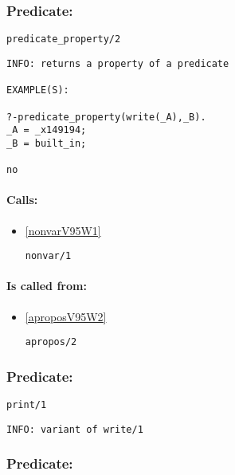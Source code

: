 \subsubsection{Predicate:} \label{predicateV95WpropertyV95W2}

\begin{verbatim}
predicate_property/2
\end{verbatim}

{\small \begin{verbatim}
INFO: returns a property of a predicate

EXAMPLE(S):

?-predicate_property(write(_A),_B).
_A = _x149194;
_B = built_in;

no

\end{verbatim}}
\paragraph{Calls:} 
\begin{itemize}
\item \ref{nonvarV95W1} 
\begin{verbatim}
nonvar/1
\end{verbatim}

\end{itemize}
\paragraph{Is called from:} 
\begin{itemize}
\item \ref{aproposV95W2} 
\begin{verbatim}
apropos/2
\end{verbatim}

\end{itemize}

\subsubsection{Predicate:} \label{printV95W1}

\begin{verbatim}
print/1
\end{verbatim}

{\small \begin{verbatim}
INFO: variant of write/1

\end{verbatim}}

\subsubsection{Predicate:} \label{printlnV95W1}

